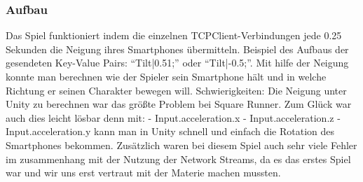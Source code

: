\subsubsection{Aufbau}
Das Spiel funktioniert indem die einzelnen TCPClient-Verbindungen jede 0.25 Sekunden die Neigung ihres Smartphones übermitteln. Beispiel des Aufbaus der gesendeten Key-Value Pairs:
“Tilt|0.51;” oder “Tilt|-0.5;”. Mit hilfe der Neigung konnte man berechnen wie der Spieler sein Smartphone hält und in welche Richtung er seinen Charakter bewegen will.
Schwierigkeiten:
Die Neigung unter Unity zu berechnen war das größte Problem bei Square Runner. Zum Glück war auch dies leicht lösbar denn mit:
\newline 
- Input.acceleration.x
\newline
- Input.acceleration.z
\newline
- Input.acceleration.y
\newline
kann man in Unity schnell und einfach die Rotation des Smartphones bekommen.
Zusätzlich waren bei diesem Spiel auch sehr viele Fehler im zusammenhang mit der Nutzung der Network Streams, da es das erstes Spiel war und wir uns erst vertraut mit der Materie machen mussten.
